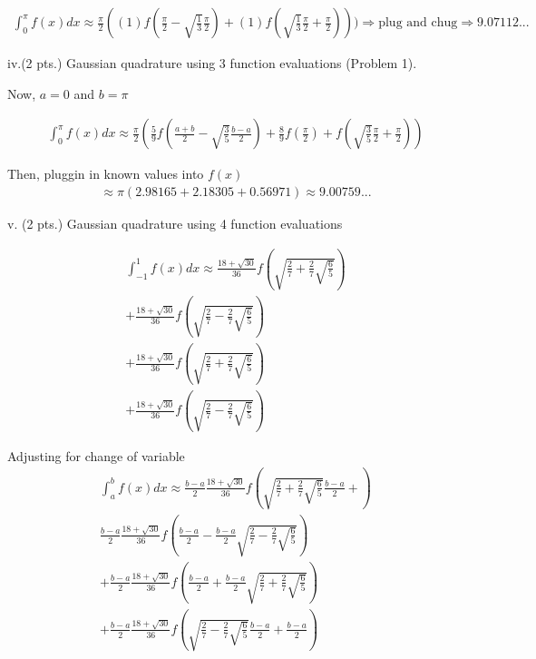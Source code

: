 \documentclass{article}
\begin{document}
\begin{gather*}
  \int_{0}^{\pi}f(x)dx \approx \frac{\pi}{2}((1)f(\frac{\pi}{2}    - \sqrt{\frac{1}{3}}    \frac{\pi}{2}) + (1)f(\sqrt{\frac{1}{3}}\frac{\pi}{2}  + \frac{\pi}{2}))) \Rightarrow \text{plug and chug} \Rightarrow 9.07112...
\end{gather*}

iv.(2 pts.) Gaussian quadrature using 3 function evaluations (Problem 1).

Now, $a = 0$ and $ b = \pi$

\begin{gather*}
 \int_{0}^{\pi} f(x)dx \approx \frac{\pi}{2} \left(\frac{5}{9} f(\frac{a+b}{2} - \sqrt{\frac{3}{5}} \frac{b-a}{2}           )  + \frac{8}{9}f(\frac{\pi}{2}       )                  + f(\sqrt{\frac{3}{5}}   \frac{\pi}{2} + \frac{\pi}{2} )   \right)
%
\end{gather*}

Then, pluggin in known values into $f(x)$
\begin{gather*}
 \approx \pi (2.98165 + 2.18305 + 0.56971) \approx 9.00759...
\end{gather*}



v. (2 pts.) Gaussian quadrature using 4 function evaluations

\begin{gather*}
\int_{-1}^{1} f(x)dx \approx \frac{18 + \sqrt{30}}{36} f(\sqrt{\frac{2}{7} + \frac{2}{7} \sqrt{\frac{6}{5}}}) \\ + \frac{18 + \sqrt{30}}{36} f(\sqrt{\frac{2}{7} - \frac{2}{7} \sqrt{\frac{6}{5}}}) \\  + \frac{18 + \sqrt{30}}{36} f(\sqrt{\frac{2}{7} + \frac{2}{7}  \sqrt{\frac{6}{5}}}) \\ + \frac{18 + \sqrt{30}}{36} f(\sqrt{\frac{2}{7} - \frac{2}{7} \sqrt{\frac{6}{5}}})
\end{gather*}

Adjusting for change of variable
\begin{gather*}
  \int_{a}^{b} f(x)dx \approx \frac{b-a}{2} \frac{18 + \sqrt{30}}{36} f(\sqrt{\frac{2}{7} + \frac{2}{7} \sqrt{\frac{6}{5}}}  \frac{b-a}{2} +     ) \\ \frac{b-a}{2} \frac{18 + \sqrt{30}}{36} f( \frac{b-a}{2} - \frac{b-a}{2}  \sqrt{\frac{2}{7} - \frac{2}{7} \sqrt{\frac{6}{5}}} ) \\  +\frac{b-a}{2} \frac{18 + \sqrt{30}}{36} f ( \frac{b-a}{2} + \frac{b-a}{2}\sqrt{\frac{2}{7} + \frac{2}{7}  \sqrt{\frac{6}{5}}} ) \\ + \frac{b-a}{2} \frac{18 + \sqrt{30}}{36} f(\sqrt{\frac{2}{7} - \frac{2}{7} \sqrt{\frac{6}{5}}} \frac{b-a}{2} + \frac{b-a}{2} )
\end{gather*}
\end{document}
